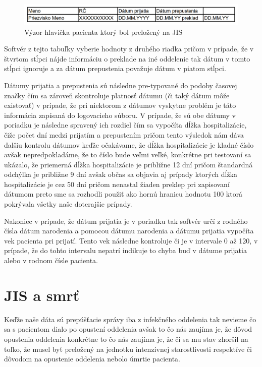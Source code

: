 \begin{figure}
	\centerline{\includegraphics[width=1\textwidth]{images/hlavicka_b}}
	\caption[Hlavička b)]{Výzor hlavička pacienta ktorý bol preložený na JIS}
	\label{obr:hlav_b}
\end{figure}

Softvér z tejto tabuľky vyberie hodnoty z druhého riadka pričom v prípade, že v štvrtom stĺpci nájde informáciu o preklade na iné oddelenie tak dátum v tomto stĺpci ignoruje a za dátum prepustenia považuje dátum v piatom stĺpci.

Dátumy prijatia a prepustenia sú následne pre-typované do podoby časovej značky čím sa zároveň skontroluje platnosť dátumu (či taký dátum môže existovať) v prípade, že pri niektorom z dátumov vyskytne problém je táto informácia zapísaná do logovacieho súboru. V prípade, že sú obe dátumy v poriadku je následne spravený ich rozdiel čím sa vypočíta dĺžka hospitalizácie, čiže počet dní medzi prijatím a prepustením pričom tento výsledok nám dáva ďalšiu kontrolu dátumov keďže očakávame, že dĺžka hospitalizácie je kladné číslo avšak nepredpokladáme, že to číslo bude veľmi veľké, konkrétne pri testovaní sa ukázalo, že priemerná dĺžka hospitalizácie je približne 12 dní pričom štandardná odchýlka je približne 9 dní avšak občas sa objavia aj prípady ktorých dĺžka hospitalizácie je cez 50 dní pričom nenastal žiaden preklep pri zapisovaní dátumom preto sme sa rozhodli použiť ako hornú hranicu hodnotu 100 ktorá pokrývala všetky naše doterajšie prípady.

Nakoniec v prípade, že dátum prijatia je v poriadku tak softvér určí z rodného čísla dátum narodenia a pomocou dátumu narodenia a dátumu prijatia vypočíta vek pacienta pri prijatí. Tento vek následne kontroluje či je v intervale 0 až 120, v prípade, že do tohto intervalu nepatrí indikuje to chyba buď v dátume prijatia alebo v rodnom čísle pacienta.

\section{JIS a smrť}

Keďže naše dáta sú prepúšťacie správy iba z infekčného oddelenia tak nevieme čo sa s pacientom dialo po opustení oddelenia avšak to čo nás zaujíma je, že dôvod opustenia oddelenia konkrétne to čo nás zaujíma je, že či sa mu stav zhoršil na toľko, že musel byť preložený na jednotku intenzívnej starostlivosti respektíve či dôvodom na opustenie oddelenia nebolo úmrtie pacienta.

